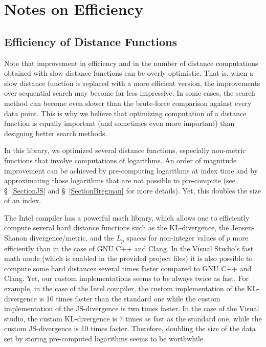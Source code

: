 \documentclass[runningheads,a4paper]{llncs}
\begin{document}
\section{Notes on Efficiency}\label{SectionEfficiency}

\subsection{Efficiency of Distance Functions}
Note that improvement in efficiency and in the number of distance computations
obtained with slow distance functions can be overly optimistic.
That is, when a slow distance function is replaced with a more efficient version,
the improvements over sequential search may become far less impressive.
In some cases, the search method can become even slower than the brute-force
comparison against every data point.
This is why we believe that optimizing  computation of a distance function 
is equally important (and sometimes even more important) 
than designing better search methods.

In this library, we optimized several distance functions, 
especially non-metric functions that involve computations of logarithms.
An order of magnitude improvement can be achieved by pre-computing 
logarithms at index time and by approximating those logarithms that are not possible
to pre-compute (see \S~\ref{SectionJS} and \S~\ref{SectionBregman} for more details).
Yet, this doubles the size of an index.

The Intel compiler has a powerful math library, 
which allows one to efficiently compute several hard distance functions
such as the KL-divergence, the Jensen-Shanon divergence/metric, and
the $L_p$ spaces for non-integer values of $p$ more efficiently than in the case of GNU C++
and Clang.
In the Visual Studio's fast math mode (which is enabled in the provided project files)
it is also possible to compute some hard distances several times faster compared to GNU C++ and Clang.
Yet, our custom implementations seems to be always twice as fast. 
For example, in the case of the Intel compiler,
the custom implementation of the KL-divergence is 10 times faster 
than the standard one while
the custom implementation of the JS-divergence is two times faster.
In the case of the Visual studio, the custom KL-divergence is 
7 times as fast as the standard one, while the custom JS-divergence is 10 times faster.
Therefore,
doubling the size of the data set by storing pre-computed logarithms seems to be worthwhile.
\end{document}
